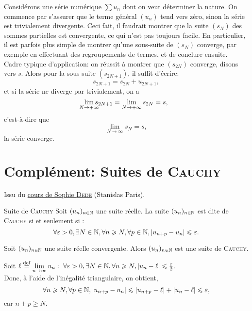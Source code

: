 Considérons une série numérique $\sum u_n$ dont on veut déterminer la nature. On commence par s'assurer que le terme général $(u_n)$ tend vers zéro, sinon la série est trivialement divergente. Ceci fait, il faudrait montrer que la suite $(s_N)$ des sommes partielles est convergente, ce qui n'est pas toujours facile. En particulier, il est parfois plus simple de montrer qu'une sous-suite de $(s_N)$ converge, par exemple en effectuant des regroupements de termes, et de conclure ensuite. \\
Cadre typique d'application: on réussit à montrer que $(s_{2N})$ converge, disons vers $s$. Alors pour la sous-suite $(s_{2N+1})$, il suffit d'écrire:
$$s_{2N+1} = s_{2N} + u_{2N+1},$$
et si la série ne diverge par trivialement, on a
$$\smashoperator{\lim_{N \to + \infty}} s_{2N+1} = \lim_{N \to + \infty} s_{2N} = s,$$
c'est-à-dire que 
$$\lim_{N \to \infty} s_N = s,$$
la série converge. 

\section{Complément: Suites de \textsc{Cauchy}}

Issu du \href{https://sophiedede.wordpress.com/}{cours de Sophie \textsc{Dede}} (Stanislas Paris). \\
\begin{defi}{Suite de \textsc{Cauchy}}
    Soit $(u_n)_{n \in \mathbb{N}}$ une suite réelle. La suite $(u_n)_{n \in \mathbb{N}}$ est dite de \textsc{Cauchy} si et seulement si :
    $$\forall \varepsilon > 0, \exists N \in \mathbb{N}, \forall n \geqslant N, \forall p \in \mathbb{N}, |u_{n+p} - u_n| \leqslant \varepsilon.$$
\end{defi}

\begin{prop}{}
    Soit $(u_n)_{n \in \mathbb{N}}$ une suite réelle convergente. Alors  $(u_n)_{n \in \mathbb{N}}$ est une suite de \textsc{Cauchy}.
\end{prop}

\begin{preuve}
    Soit $\ell \overset{\mathrm{\tiny def}}{=} \lim\limits_{n \to \infty} u_n:\ \forall \varepsilon > 0, \exists N \in \mathbb{N}, \forall n \geqslant N, |u_n - \ell| \leqslant \frac{\varepsilon}{2}$. \\
    Donc, à l'aide de l'inégalité triangulaire, on obtient,
    $$\forall n \geqslant N, \forall p \in \mathbb{N}, |u_{n+p} - u_n| \leqslant |u_{n+p} - \ell| + |u_n - \ell| \leqslant \varepsilon,$$
    car $n + p \geqslant N$.
\end{preuve}

